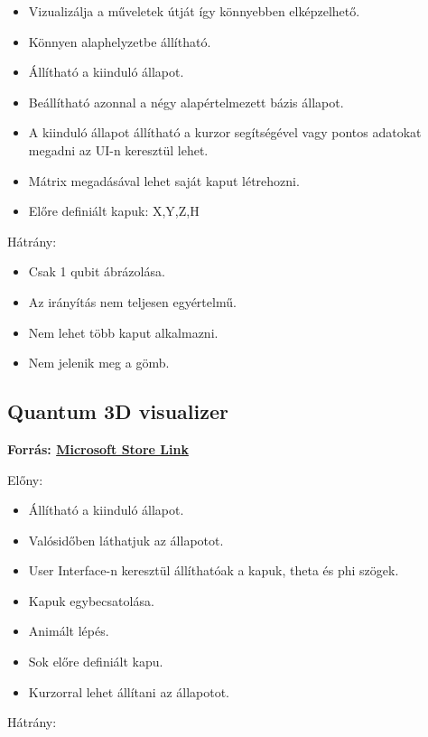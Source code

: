 \documentclass[fontsize=12pt,a4paper]{article}
\begin{document}
\begin{itemize}
    \item Vizualizálja a műveletek útját így könnyebben elképzelhető.
    \item Könnyen alaphelyzetbe állítható.
    \item Állítható a kiinduló állapot.
    \item Beállítható azonnal a négy alapértelmezett bázis állapot.
    \item A kiinduló állapot állítható a kurzor segítségével vagy pontos adatokat megadni az UI-n keresztül lehet.
    \item Mátrix megadásával lehet saját kaput létrehozni.
    \item Előre definiált kapuk: X,Y,Z,H
\end{itemize}

Hátrány:

\begin{itemize}
    \item Csak 1 qubit ábrázolása.
    \item Az irányítás nem teljesen egyértelmű.
    \item Nem lehet több kaput alkalmazni.
    \item Nem jelenik meg a gömb.
\end{itemize}

\vspace{0.4cm}
\subsection{Quantum 3D visualizer}
\textbf{Forrás: \href{https://apps.microsoft.com/detail/9pj77hf1w39t?ocid=webpdpshare}{Microsoft Store Link}}

Előny:

\begin{itemize}
    \item Állítható a kiinduló állapot.
    \item Valósidőben láthatjuk az állapotot.
    \item User Interface-n keresztül állíthatóak a kapuk, theta és phi szögek.
    \item Kapuk egybecsatolása.
    \item Animált lépés.
    \item Sok előre definiált kapu.
    \item Kurzorral lehet állítani az állapotot.
\end{itemize}

\noindent Hátrány:
\end{document}

